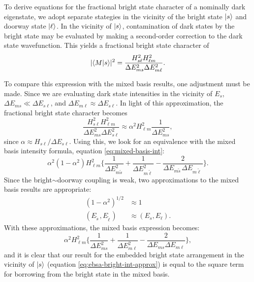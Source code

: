 \documentclass[12pt]{mitthesis}
\newcommand{\ts}{\tilde{s}\,}
\newcommand{\tl}{\tilde{\ell}\,}
\begin{document}
To derive equations for the fractional bright state character of a
nominally dark eigenstate, we adopt separate stategies in the vicinity
of the bright state $\mathinner{|{s}\rangle}$ and doorway state $\mathinner{|{\ell}\rangle}$.  In the
vicinity of $\mathinner{|{s}\rangle}$, contamination of dark states by the bright
state may be evaluated by making a second-order correction to the dark
state wavefunction.  This yields a fractional bright state character
of
\begin{equation}\label{eq:ebsa-bright-int}
\lvert \mathinner{\langle{M|s}\rangle} \rvert^2 = 
    \frac{H_{s\ell}^2 H_{\ell m}^2}{\Delta E_{ms}^2 \Delta E_{m\ell}^2}.
\end{equation}

To compare this expression with the mixed basis results, one
adjustment must be made. Since we are evaluating dark state
intensities in the vicinity of $E_s$, $\Delta E_{ms} \ll \Delta
E_{s\ell}$, and $\Delta E_{m\ell} \approx \Delta E_{s\ell}$. In light
of this approximation, the fractional bright state character becomes
\begin{equation}\label{eq:ebsa-bright-int-approx}
  \frac{H_{s\ell}^2 H_{\ell m}^2}{\Delta E_{ms}^2 \Delta E_{s\ell}^2} \approx 
  \alpha^2 H_{\ell m}^2 \frac{1}{\Delta E_{ms}^2},
\end{equation}
since $\alpha \approx H_{s\ell} / \Delta E_{s\ell}$.
Using this, we look for an equivalence with the mixed basis intensity
formula, equation \ref{eq:mixed-basis-int}:
\begin{equation*}
  \alpha^2 (1-\alpha^2) H_{\ell m}^2 
   \biggl \lbrace 
   \frac{1}{\Delta E_{m \ts}^2} +\frac{1}{\Delta E_{m \tl}^2} 
   - \frac{2}{\Delta E_{m \ts} \Delta E_{m \tl}}
   \biggr \rbrace.
\end{equation*}
Since the bright$\sim$doorway coupling is weak, two approximations to
the mixed basis results are appropriate:
\begin{equation}
  \label{eq:weak-coupling-approx}
  \begin{split}
    (1 - \alpha^2)^{1/2} &\approx 1 \\
    (E_{\ts}, E_{\tl}) &\approx (E_s, E_{\ell}).
  \end{split}
\end{equation}
With these approximations, the mixed basis expression becomes:
\begin{equation}
  \label{eq:mixed-basis-int-approx}
  \alpha^2 H_{\ell m}^2 
   \biggl \lbrace 
   \frac{1}{\Delta E_{ms}^2} +\frac{1}{\Delta E_{m\ell}^2} 
   - \frac{2}{\Delta E_{ms} \Delta E_{m\ell}}
   \biggr \rbrace,
\end{equation}
and it is clear that our result for the embedded bright state
arrangement in the vicinity of $\mathinner{|{s}\rangle}$ (equation
\ref{eq:ebsa-bright-int-approx}) is equal to the square term for
borrowing from the bright state in the mixed basis.
\end{document}
